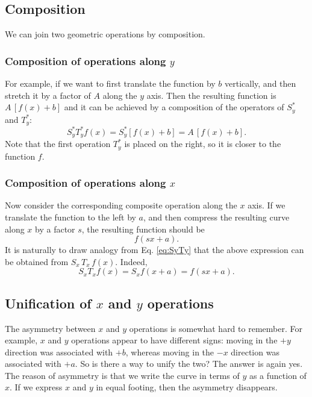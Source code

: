 \documentclass{article}
\begin{document}
\subsection{Composition}


We can join two geometric operations by composition.


\subsubsection{Composition of operations along $y$}

For example, if we want to first translate the function by $b$ vertically,
and then stretch it by a factor of $A$ along the $y$ axis.
Then the resulting function is $A \, [f(x) + b]$
and it can be achieved by a composition of the operators
of $S_y^*$ and $T_y^*$:
\begin{equation}
S_y^* T_y^* f(x) = S_y^* [f(x) + b] = A \, [f(x) + b].
\label{eq:SyTy}
\end{equation}
Note that the first operation $T_y^*$ is placed on the right,
so it is closer to the function $f$.


\subsubsection{Composition of operations along $x$}

Now consider the corresponding composite operation along the $x$ axis.
%
If we translate the function to the left by $a$,
and then compress the resulting curve along $x$
by a factor $s$,
the resulting function should be
$$
  f(sx+a).
$$
%
It is naturally to draw analogy from Eq. \eqref{eq:SyTy} that
the above expression can be obtained from $S_x \, T_x \, f(x)$.
Indeed,
$$
S_x T_x f(x) = S_x f(x + a) = f(s x + a).
$$

\subsection{Unification of $x$ and $y$ operations}

The asymmetry between $x$ and $y$ operations
is somewhat hard to remember.
%
For example, $x$ and $y$
operations appear to have different signs:
moving in the $+y$ direction was associated with $+b$,
whereas moving in the $-x$ direction was associated with $+a$.
So is there a way to unify the two?
The answer is again yes.
The reason of asymmetry is that
we write the curve in terms of $y$ as a function of $x$.
%
If we express $x$ and $y$ in equal footing,
then the asymmetry disappears.
\end{document}
